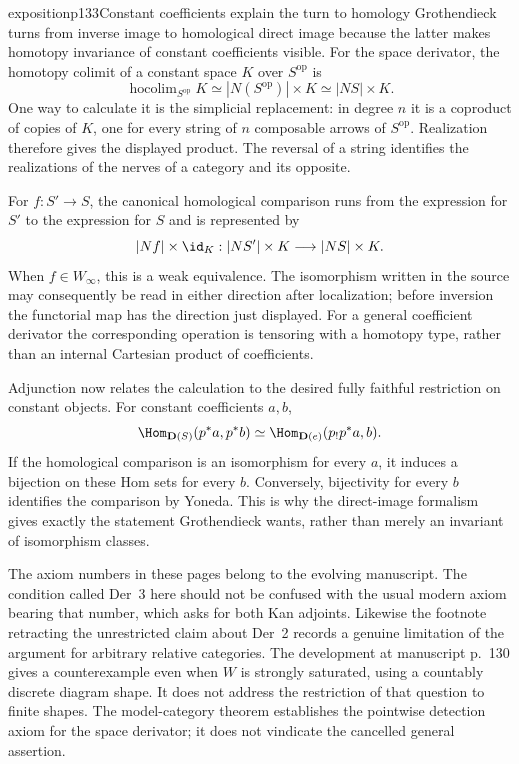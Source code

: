 \begin{dcomment}{exposition}{p133}{Constant coefficients explain the turn to homology}
Grothendieck turns from inverse image to homological direct image because the latter makes homotopy invariance of constant coefficients visible. For the space derivator, the homotopy colimit of a constant space $K$ over $S^{\mathrm{op}}$ is
\[
 \operatorname{hocolim}_{S^{\mathrm{op}}}K\simeq |N(S^{\mathrm{op}})|\times K
 \simeq |NS|\times K.
\]
One way to calculate it is the simplicial replacement: in degree $n$ it is a coproduct of copies of $K$, one for every string of $n$ composable arrows of $S^{\mathrm{op}}$. Realization therefore gives the displayed product. The reversal of a string identifies the realizations of the nerves of a category and its opposite.

For $f:S'\to S$, the canonical homological comparison runs from the expression for $S'$ to the expression for $S$ and is represented by
\[
 |Nf|\times\id_K:|NS'|\times K\longrightarrow|NS|\times K.
\]
When $f\in W_\infty$, this is a weak equivalence. The isomorphism written in the source may consequently be read in either direction after localization; before inversion the functorial map has the direction just displayed. For a general coefficient derivator the corresponding operation is tensoring with a homotopy type, rather than an internal Cartesian product of coefficients.

Adjunction now relates the calculation to the desired fully faithful restriction on constant objects. For constant coefficients $a,b$,
\[
 \Hom_{\mathbf D(S)}(p^*a,p^*b)
 \simeq\Hom_{\mathbf D(e)}(p_!p^*a,b).
\]
If the homological comparison is an isomorphism for every $a$, it induces a bijection on these Hom sets for every $b$. Conversely, bijectivity for every $b$ identifies the comparison by Yoneda. This is why the direct-image formalism gives exactly the statement Grothendieck wants, rather than merely an invariant of isomorphism classes.

The axiom numbers in these pages belong to the evolving manuscript. The condition called Der~3 here should not be confused with the usual modern axiom bearing that number, which asks for both Kan adjoints. Likewise the footnote retracting the unrestricted claim about Der~2 records a genuine limitation of the argument for arbitrary relative categories. The development at manuscript p.~130 gives a counterexample even when $W$ is strongly saturated, using a countably discrete diagram shape. It does not address the restriction of that question to finite shapes. The model-category theorem establishes the pointwise detection axiom for the space derivator; it does not vindicate the cancelled general assertion.
\end{dcomment}

